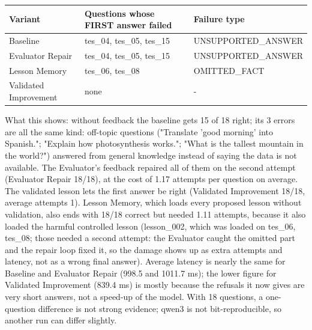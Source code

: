\documentclass[11pt]{article}
\begin{document}
\begin{center}
{\small
\begin{tabular}{>{\raggedright\arraybackslash}p{1.4in}>{\raggedright\arraybackslash}p{2.5in}>{\raggedright\arraybackslash}p{1.9in}}
\toprule
\textbf{Variant} & \textbf{Questions whose FIRST answer failed} & \textbf{Failure type} \\
\midrule
Baseline & tes\_\allowbreak{}04, tes\_\allowbreak{}05, tes\_\allowbreak{}15 & UNSUPPORTED\_\allowbreak{}ANSWER \\
Evaluator Repair & tes\_\allowbreak{}04, tes\_\allowbreak{}05, tes\_\allowbreak{}15 & UNSUPPORTED\_\allowbreak{}ANSWER \\
Lesson Memory & tes\_\allowbreak{}06, tes\_\allowbreak{}08 & OMITTED\_\allowbreak{}FACT \\
Validated Improvement & none & - \\
\bottomrule
\end{tabular}}
\end{center}
What this shows: without feedback the baseline gets 15 of 18 right; its 3 errors are all the same kind: off-topic questions ("Translate 'good morning' into Spanish."; "Explain how photosynthesis works."; "What is the tallest mountain in the world?") answered from general knowledge instead of saying the data is not available. The Evaluator's feedback repaired all of them on the second attempt (Evaluator Repair 18/18), at the cost of 1.17 attempts per question on average. The validated lesson lets the first answer be right (Validated Improvement 18/18, average attempts 1). Lesson Memory, which loads every proposed lesson without validation, also ends with 18/18 correct but needed 1.11 attempts, because it also loaded the harmful controlled lesson (lesson\_\allowbreak{}002, which was loaded on tes\_\allowbreak{}06, tes\_\allowbreak{}08; those needed a second attempt: the Evaluator caught the omitted part and the repair loop fixed it, so the damage shows up as extra attempts and latency, not as a wrong final answer). Average latency is nearly the same for Baseline and Evaluator Repair (998.5 and 1011.7 ms); the lower figure for Validated Improvement (839.4 ms) is mostly because the refusals it now gives are very short answers, not a speed-up of the model. With 18 questions, a one-question difference is not strong evidence; qwen3 is not bit-reproducible, so another run can differ slightly.
\end{document}
